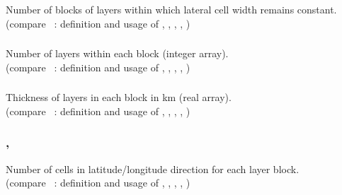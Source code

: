 \subsubsection{}
Number of blocks of layers within which lateral cell width remains constant.\\
(compare ~: definition and usage of , 
, , , )
\subsubsection{}
Number of layers within each block (integer array).\\
(compare ~: definition and usage of , 
, , , )
\subsubsection{}
Thickness of layers in each block in km (real array).\\
(compare ~: definition and usage of , 
, , , )
\subsubsection{, }
Number of cells in latitude/longitude direction for each layer block.\\
(compare ~: definition and usage of , 
, , , )
